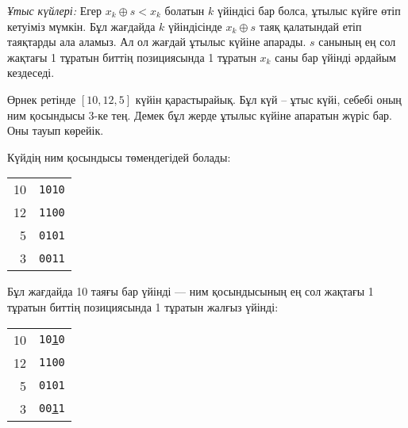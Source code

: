 \textit{Ұтыс күйлері:}
Егер $x_k \oplus s < x_k$
болатын $k$ үйіндісі бар болса, ұтылыс күйге өтіп кетуіміз мүмкін. Бұл жағдайда 
$k$ үйіндісінде $x_k \oplus s$ таяқ қалатындай 
етіп таяқтарды ала аламыз. Ал ол жағдай ұтылыс күйіне апарады. $s$ санының ең сол жақтағы 1 тұратын биттің позициясында 1 тұратын $x_k$ саны бар үйінді әрдайым кездеседі. 

Өрнек ретінде $[10,12,5]$ күйін қарастырайық. 
Бұл күй -- ұтыс күйі, себебі оның ним қосындысы 3-ке тең.
Демек бұл жерде ұтылыс күйіне апаратын жүріс бар.
Оны тауып көрейік. 


Күйдің ним қосындысы төмендегідей болады:

\begin{center}
\begin{tabular}{r|r}
10 & \texttt{1010} \\
12 & \texttt{1100} \\
5 & \texttt{0101} \\
\hline
3 & \texttt{0011} \\
\end{tabular}
\end{center}

Бұл жағдайда 10 таяғы бар үйінді ––
ним қосындысының ең сол жақтағы 
1 тұратын биттің позициясында 1 тұратын жалғыз үйінді:


\begin{center}
\begin{tabular}{r|r}
10 & \texttt{10\underline{1}0} \\
12 & \texttt{1100} \\
5 & \texttt{0101} \\
\hline
3 & \texttt{00\underline{1}1} \\
\end{tabular}
\end{center}

